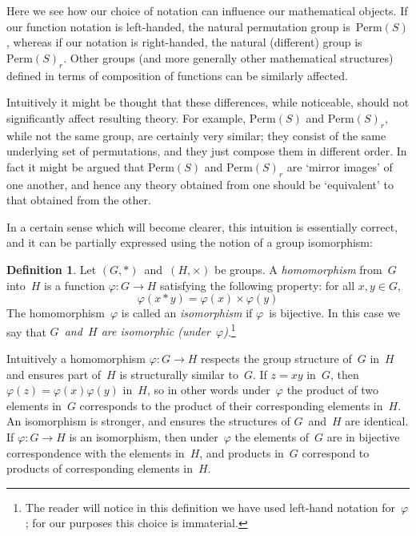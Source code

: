 \documentclass[letterpaper]{article}
\theoremstyle{definition}
\newtheorem*{defn}{Definition}
\theoremstyle{plain}
\newcommand{\perm}[1]{\mathrm{Perm}({#1})}
\begin{document}
Here we see how our choice of notation can influence our mathematical objects. If our function notation is left-handed, the natural permutation group is~$\perm{S}$, whereas if our notation is right-handed, the natural (different) group is~$\perm{S}_r$. Other groups (and more generally other mathematical structures) defined in terms of composition of functions can be similarly affected.

Intuitively it might be thought that these differences, while noticeable, should not significantly affect resulting theory. For example, $\perm{S}$ and $\perm{S}_r$, while not the same group, are certainly very similar; they consist of the same underlying set of permutations, and they just compose them in different order. In fact it might be argued that $\perm{S}$ and $\perm{S}_r$ are `mirror images' of one another, and hence any theory obtained from one should be `equivalent' to that obtained from the other.

In a certain sense which will become clearer, this intuition is essentially correct, and it can be partially expressed using the notion of a group isomorphism:
\goodbreak
\begin{defn}
Let $(G,*)$~and~$(H,\times)$ be groups. A \emph{homomorphism} from~$G$ into~$H$ is a function $\varphi:G\to H$ satisfying the following property: for all $x,y\in G$,
$$\varphi(x*y)=\varphi(x)\times\varphi(y)$$
The homomorphism~$\varphi$ is called an \emph{isomorphism} if $\varphi$~is bijective. In this case we say that \emph{$G$~and~$H$ are isomorphic (under~$\varphi$)}.\footnote{The reader will notice in this definition we have used left-hand notation for~$\varphi$; for our purposes this choice is immaterial.}
\end{defn}
\noindent Intuitively a homomorphism $\varphi:G\to H$ respects the group structure of~$G$ in~$H$ and ensures part of~$H$ is structurally similar to~$G$. If $z=xy$ in~$G$, then $\varphi(z)=\varphi(x)\varphi(y)$ in~$H$, so in other words under~$\varphi$ the product of two elements in~$G$ corresponds to the product of their corresponding elements in~$H$. An isomorphism is stronger, and ensures the structures of $G$~and~$H$ are identical. If $\varphi:G\to H$ is an isomorphism, then under~$\varphi$ the elements of~$G$ are in bijective correspondence with the elements in~$H$, and products in~$G$ correspond to products of corresponding elements in~$H$.
\end{document}
